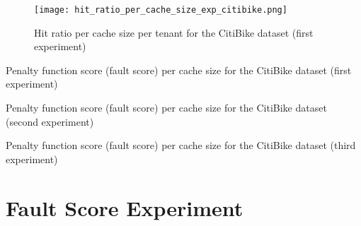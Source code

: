 \newpage

\begin{figure}
    \centering
    \texttt{[image: hit\_ratio\_per\_cache\_size\_exp\_citibike.png]}
    \caption{Hit ratio per cache size per tenant for the CitiBike dataset (first experiment)}
    \label{fig:hit_ratio_per_cache_size_exp_citibike}
\end{figure}

\begin{table}[ht]
    \centering
    \small
    \caption{Penalty function score (fault score) per cache size for the CitiBike dataset (first experiment)}
    \label{tab:fault-score-per-buffer-size-citibike}
\end{table}

\begin{table}[ht]
    \centering
    \small
    \caption{Penalty function score (fault score) per cache size for the CitiBike dataset (second experiment)}
    \label{tab:fault-score-per-buffer-size-citibike-2}
\end{table}

\begin{table}[ht]
    \centering
    \small
    \caption{Penalty function score (fault score) per cache size for the CitiBike dataset (third experiment)}
    \label{tab:fault-score-per-buffer-size-citibike-3}
\end{table}

\newpage

\section{Fault Score Experiment}
